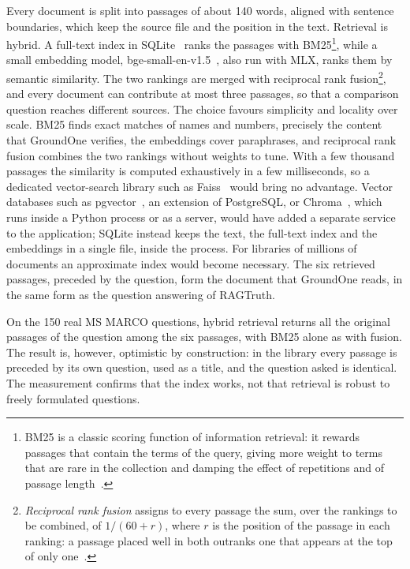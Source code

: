 Every document is split into passages of about 140 words, aligned with sentence boundaries, which keep the source file
and the position in the text. Retrieval is hybrid. A full-text index in SQLite~\cite{sqlite2026fts5} ranks the passages
with BM25\footnote{BM25 is a classic scoring function of information retrieval: it rewards passages that contain the
terms of the query, giving more weight to terms that are rare in the collection and damping the effect of repetitions
and of passage length~\cite{robertson2009bm25}.}, while a small embedding model, bge-small-en-v1.5~\cite{xiao2024cpack},
also run with MLX, ranks them by semantic similarity. The two rankings are merged with reciprocal rank
fusion\footnote{\emph{Reciprocal rank fusion} assigns to every passage the sum, over the rankings to be combined, of
$1/(60 + r)$, where $r$ is the position of the passage in each ranking: a passage placed well in both outranks one that
appears at the top of only one~\cite{cormack2009rrf}.}, and every document can contribute at most three passages, so
that a comparison question reaches different sources. The choice favours simplicity and locality over scale. BM25 finds exact matches of names and numbers, precisely the
content that GroundOne verifies, the embeddings cover paraphrases, and reciprocal rank fusion combines the two rankings
without weights to tune. With a few thousand passages the similarity is computed exhaustively in a few milliseconds, so
a dedicated vector-search library such as Faiss~\cite{douze2024faiss} would bring no advantage. Vector databases such
as pgvector~\cite{pgvector}, an extension of PostgreSQL, or Chroma~\cite{chroma}, which runs inside a Python process or
as a server, would have added a separate service to the application; SQLite instead keeps the text, the full-text index
and the embeddings in a single file, inside the process. For libraries of millions of documents an approximate index
would become necessary. The six retrieved passages, preceded by the question, form the
document that GroundOne reads, in the same form as the question answering of RAGTruth.

On the 150 real MS MARCO questions, hybrid retrieval returns all the original passages of the question among the six
passages, with BM25 alone as with fusion. The result is, however, optimistic by construction: in the library every
passage is preceded by its own question, used as a title, and the question asked is identical. The measurement confirms
that the index works, not that retrieval is robust to freely formulated questions.

